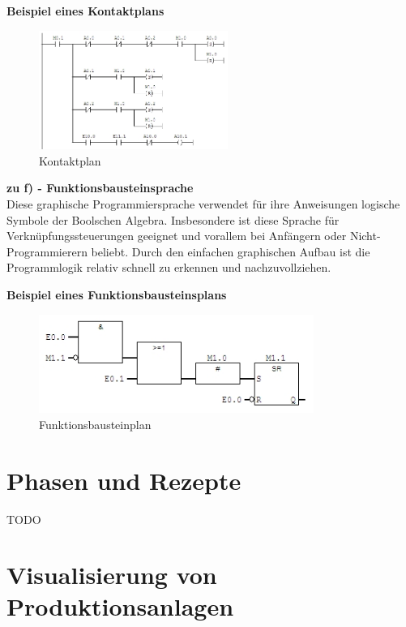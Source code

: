 	\textbf{Beispiel eines Kontaktplans}	\\
	\begin{figure}[h!]
  		\centering
    	\includegraphics[width=0.55\textwidth]{graphics/stateoftheart/kop.jpg}
  		\caption{Kontaktplan}
	\end{figure}
	
	\textbf{zu f) - Funktionsbausteinsprache}\\

	Diese graphische Programmiersprache verwendet für ihre Anweisungen logische Symbole der Boolschen Algebra. Insbesondere ist diese Sprache für Verknüpfungssteuerungen geeignet und vorallem bei Anfängern oder Nicht-Programmierern beliebt. Durch den einfachen graphischen Aufbau ist die Programmlogik relativ schnell zu erkennen und nachzuvollziehen.

	\textbf{Beispiel eines Funktionsbausteinsplans}	\\
	\begin{figure}[h!]
  		\centering
    	\includegraphics[width=0.8\textwidth]{graphics/stateoftheart/funktionsbausteinplan.jpg}
  		\caption{Funktionsbausteinplan}
	\end{figure}

\section{Phasen und Rezepte}

TODO

\section{Visualisierung von Produktionsanlagen}
